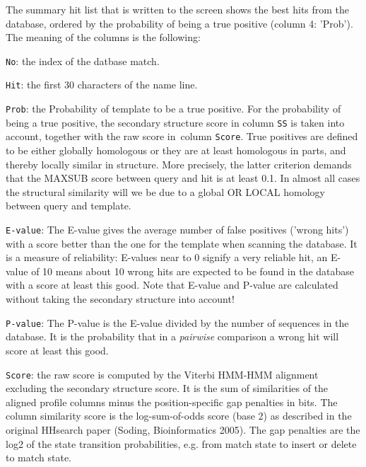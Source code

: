 \documentclass[11pt,a4paper]{article}
\begin{document}
The summary hit list that is written to the screen shows the best hits from the 
database, ordered by the probability of being a true positive (column 4: 'Prob'). 
The meaning of the columns is the following:
\vspace{5mm}

\renewcommand{\arraystretch}{1.2}

\begin{description}
\item{\verb`No`}: the index of the datbase match.

\item{\verb`Hit`}: the first 30 characters of the name line.

\item{\verb`Prob`}: the Probability of template to be a true positive.
For the probability of being a true positive, the secondary structure score 
in column \verb`SS` is taken into account, together with the raw score in\
column \verb`Score`. 
True positives are defined to be either globally homologous or they are at least 
homologous in parts, and thereby locally similar in structure. More precisely, 
the latter criterion demands that the MAXSUB score between query and hit is at 
least 0.1. In almost all cases the structural similarity will we be due to a global
OR LOCAL homology between query and template.

\item{\verb`E-value`}:
The E-value gives the average number of false positives ('wrong hits') with a score 
better than the one for the template when scanning the database. It is a measure of 
reliability: E-values near to 0 signify a very reliable hit, an E-value of 10 means 
about 10 wrong hits are expected to be found in the database with a score at least 
this good. Note that E-value and P-value are calculated without taking the secondary 
structure into account!


\item{\verb`P-value`}: 
The P-value is the E-value divided by the number of sequences in the database.
It is the probability that in a \emph{pairwise} comparison a wrong hit will score at least 
this good.

\item{\verb`Score`}: the raw score is computed by the Viterbi HMM-HMM alignment excluding the
secondary structure score. It is the sum of similarities of the aligned profile columns
minus the position-specific gap penalties in bits. The column similarity score is the 
log-sum-of-odds score (base 2) as described in the original HHsearch paper 
(Soding, Bioinformatics 2005). The gap penalties are the log2 of the state transition
probabilities, e.g. from match state to insert or delete to match state.


\end{description}
\end{document}
